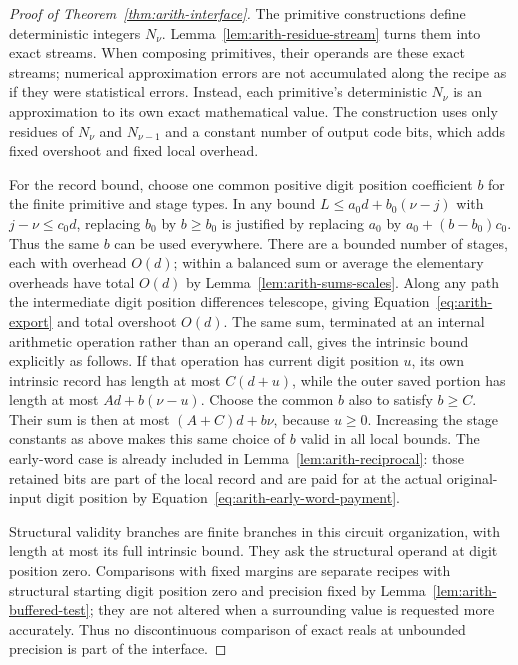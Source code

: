 \begin{proof}[Proof of Theorem~\ref{thm:arith-interface}]
The primitive constructions define deterministic integers $N_\nu$.
Lemma~\ref{lem:arith-residue-stream}
turns them into exact streams.  When composing primitives,
their operands are these exact streams; numerical approximation
errors are not accumulated along the recipe as if they were
statistical errors.  Instead, each primitive's deterministic
$N_\nu$ is an approximation to its own exact mathematical value.
The construction uses only residues of $N_\nu$ and $N_{\nu-1}$ and
a constant number of output code bits, which adds fixed
overshoot and fixed local overhead.

For the record bound, choose one common positive digit position
coefficient $b$ for the finite primitive and stage types.  In any
bound $L\leq a_0d+b_0(\nu-j)$ with $j-\nu\leq c_0d$, replacing
$b_0$ by $b\geq b_0$ is justified by replacing $a_0$ by
$a_0+(b-b_0)c_0$.  Thus the same $b$ can be used everywhere.
There are a bounded number of stages, each with overhead $O(d)$;
within a balanced sum or average the elementary overheads have total
$O(d)$ by Lemma~\ref{lem:arith-sums-scales}.  Along any path
the intermediate digit position differences telescope, giving
Equation~\eqref{eq:arith-export} and total overshoot $O(d)$.
The same sum, terminated at an internal arithmetic operation
rather than an operand call, gives the intrinsic bound explicitly
as follows.  If that operation has current digit position $u$, its own
intrinsic record has length at most $C(d+u)$, while the outer
saved portion has length at most $A d+b(\nu-u)$.  Choose the
common $b$ also to satisfy $b\geq C$.  Their sum is then at most
$(A+C)d+b\nu$, because $u\geq0$.  Increasing the stage constants
as above makes this same choice of $b$ valid in all local bounds.
The early-word case is already included in
Lemma~\ref{lem:arith-reciprocal}: those retained bits are part of
the local record and are paid for at the actual original-input
digit position by Equation~\eqref{eq:arith-early-word-payment}.

Structural validity branches are finite branches in this circuit
organization, with length at most its full intrinsic bound.
They ask the structural operand at digit position zero.  Comparisons with fixed margins
are separate recipes with structural starting digit position zero and
precision fixed by Lemma~\ref{lem:arith-buffered-test}; they are
not altered when a surrounding value is requested more accurately.
Thus no discontinuous comparison of exact reals at unbounded
precision is part of the interface.


\end{proof}
